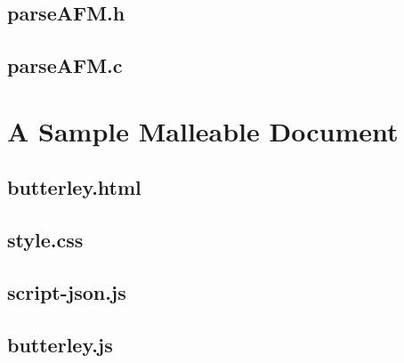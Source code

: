 \newpage

\subsection{parseAFM.h}


\newpage

\subsection{parseAFM.c}


\newpage

\section{A Sample Malleable Document}
\label{app:sampledoc}
\subsection{butterley.html}


\subsection{style.css}

\newpage

\subsection{script-json.js}


\newpage

\subsection{butterley.js}

